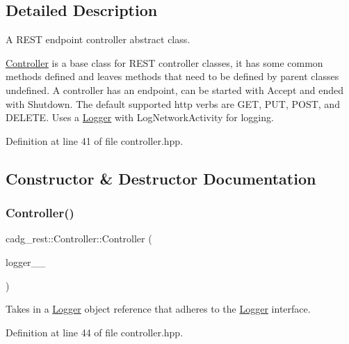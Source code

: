 \subsection{Detailed Description}
A R\+E\+ST endpoint controller abstract class. 

\mbox{\hyperlink{classcadg__rest_1_1_controller}{Controller}} is a base class for R\+E\+ST controller classes, it has some common methods defined and leaves methods that need to be defined by parent classes undefined. A controller has an endpoint, can be started with Accept and ended with Shutdown. The default supported http verbs are G\+ET, P\+UT, P\+O\+ST, and D\+E\+L\+E\+TE. Uses a \mbox{\hyperlink{classcadg__rest_1_1_logger}{Logger}} with Log\+Network\+Activity for logging. 

Definition at line 41 of file controller.\+hpp.



\subsection{Constructor \& Destructor Documentation}
\mbox{\label{classcadg__rest_1_1_controller_a0232077dc5eee421cacfb9fb8b08325f}} 
\subsubsection{\texorpdfstring{Controller()}{Controller()}}
{\footnotesize\ttfamily cadg\+\_\+rest\+::\+Controller\+::\+Controller (\begin{DoxyParamCaption}\item[{\mbox{\hyperlink{classcadg__rest_1_1_logger_interface}{Logger\+Interface}} \&}]{logger\+\_\+\+\_\+ }\end{DoxyParamCaption})\hspace{0.3cm}{\ttfamily [inline]}}



Takes in a \mbox{\hyperlink{classcadg__rest_1_1_logger}{Logger}} object reference that adheres to the \mbox{\hyperlink{classcadg__rest_1_1_logger}{Logger}} interface. 



Definition at line 44 of file controller.\+hpp.

\mbox{\label{classcadg__rest_1_1_controller_ab8dacc82d5200c0acce5163a0cb7eda7}} 
